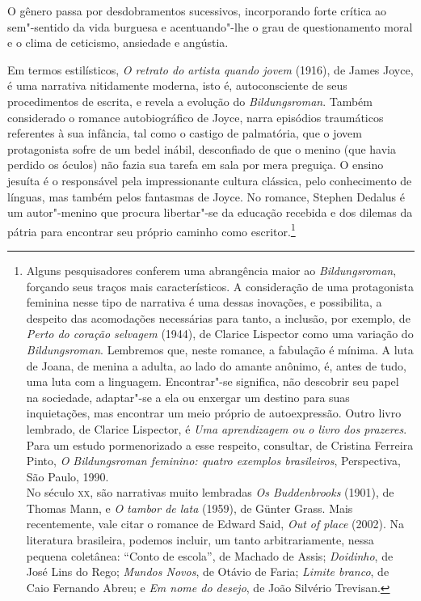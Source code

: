 O gênero passa por desdobramentos sucessivos, incorporando forte crítica
ao sem"-sentido da vida burguesa e acentuando"-lhe o grau de
questionamento moral e o clima de ceticismo, ansiedade e angústia. 

Em termos estilísticos, \textit{O retrato do
artista quando jovem} (1916), de James Joyce, é uma
narrativa nitidamente moderna, isto é, autoconsciente de seus
procedimentos de escrita, e revela a evolução do
\textit{Bildungsroman}. Também considerado o
romance autobiográfico de Joyce, narra episódios traumáticos referentes
à sua infância, tal como o castigo de palmatória, que o jovem
protagonista sofre de um bedel inábil, desconfiado de que o menino (que
havia perdido os óculos) não fazia sua tarefa em sala por mera
preguiça. O ensino jesuíta é o responsável pela impressionante cultura
clássica, pelo conhecimento de línguas, mas também pelos fantasmas de
Joyce. No romance, Stephen Dedalus é um autor"-menino que procura
libertar"-se da educação recebida e dos dilemas da pátria para
encontrar seu próprio caminho como
escritor.\footnote{Alguns pesquisadores conferem uma abrangência maior ao
\textit{Bildungsroman}, forçando seus traços mais característicos. A consideração de uma
protagonista feminina nesse tipo de narrativa é uma dessas inovações, e
possibilita, a despeito das acomodações necessárias para tanto, a
inclusão, por exemplo, de \textit{Perto do coração selvagem} (1944), de Clarice
Lispector como uma variação do \textit{Bildungsroman}.
Lembremos que, neste romance, a fabulação é mínima. A luta de Joana, de
menina a adulta, ao lado do amante anônimo, é, antes de tudo, uma luta
com a linguagem. Encontrar"-se significa, não descobrir seu papel na
sociedade, adaptar"-se a ela ou enxergar um destino para suas
inquietações, mas encontrar um meio próprio de autoexpressão. Outro
livro lembrado, de Clarice Lispector, é \textit{Uma aprendizagem ou o livro dos
prazeres}. Para um estudo pormenorizado a esse respeito, consultar, de Cristina Ferreira Pinto,
\textit{O Bildungsroman feminino: quatro exemplos brasileiros}, Perspectiva, São Paulo, 
1990.  \\No século \textsc{xx}, são narrativas muito lembradas
\textit{Os Buddenbrooks} (1901), de Thomas Mann, e \textit{O tambor de
lata} (1959), de Günter Grass. Mais recentemente, vale citar o romance
de Edward Said, \textit{Out of place} (2002). Na literatura brasileira,
podemos incluir, um tanto arbitrariamente, nessa pequena coletânea:
``Conto de escola'', de Machado de Assis; \textit{Doidinho}, de José Lins
do Rego; \textit{Mundos Novos}, de Otávio de Faria; \textit{Limite
branco}, de Caio Fernando Abreu; e \textit{Em nome do desejo}, de João Silvério Trevisan.} 

